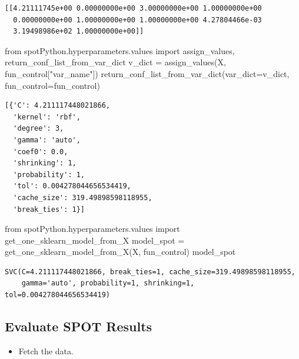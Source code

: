 \documentclass[
  letterpaper,
  DIV=11,
  numbers=noendperiod]{scrreprt}
\newenvironment{Shaded}{\begin{snugshade}}{\end{snugshade}}
\newcommand{\ImportTok}[1]{\textcolor[rgb]{0.00,0.46,0.62}{#1}}
\newcommand{\NormalTok}[1]{\textcolor[rgb]{0.00,0.23,0.31}{#1}}
\newcommand{\OperatorTok}[1]{\textcolor[rgb]{0.37,0.37,0.37}{#1}}
\newcommand{\StringTok}[1]{\textcolor[rgb]{0.13,0.47,0.30}{#1}}
\providecommand{\tightlist}{%
  \setlength{\itemsep}{0pt}\setlength{\parskip}{0pt}}\usepackage{longtable,booktabs,array}
\begin{document}
\begin{verbatim}
[[4.21111745e+00 0.00000000e+00 3.00000000e+00 1.00000000e+00
  0.00000000e+00 1.00000000e+00 1.00000000e+00 4.27804466e-03
  3.19498986e+02 1.00000000e+00]]
\end{verbatim}

\begin{Shaded}
\begin{Highlighting}[]
\ImportTok{from}\NormalTok{ spotPython.hyperparameters.values }\ImportTok{import}\NormalTok{ assign\_values, return\_conf\_list\_from\_var\_dict}
\NormalTok{v\_dict }\OperatorTok{=}\NormalTok{ assign\_values(X, fun\_control[}\StringTok{"var\_name"}\NormalTok{])}
\NormalTok{return\_conf\_list\_from\_var\_dict(var\_dict}\OperatorTok{=}\NormalTok{v\_dict, fun\_control}\OperatorTok{=}\NormalTok{fun\_control)}
\end{Highlighting}
\end{Shaded}

\begin{verbatim}
[{'C': 4.211117448021866,
  'kernel': 'rbf',
  'degree': 3,
  'gamma': 'auto',
  'coef0': 0.0,
  'shrinking': 1,
  'probability': 1,
  'tol': 0.004278044656534419,
  'cache_size': 319.49898598118955,
  'break_ties': 1}]
\end{verbatim}

\begin{Shaded}
\begin{Highlighting}[]
\ImportTok{from}\NormalTok{ spotPython.hyperparameters.values }\ImportTok{import}\NormalTok{ get\_one\_sklearn\_model\_from\_X}
\NormalTok{model\_spot }\OperatorTok{=}\NormalTok{ get\_one\_sklearn\_model\_from\_X(X, fun\_control)}
\NormalTok{model\_spot}
\end{Highlighting}
\end{Shaded}

\begin{verbatim}
SVC(C=4.211117448021866, break_ties=1, cache_size=319.49898598118955,
    gamma='auto', probability=1, shrinking=1, tol=0.004278044656534419)
\end{verbatim}

\hypertarget{evaluate-spot-results-2}{%
\subsection{Evaluate SPOT Results}\label{evaluate-spot-results-2}}

\begin{itemize}
\tightlist
\item
  Fetch the data.
\end{itemize}
\end{document}
